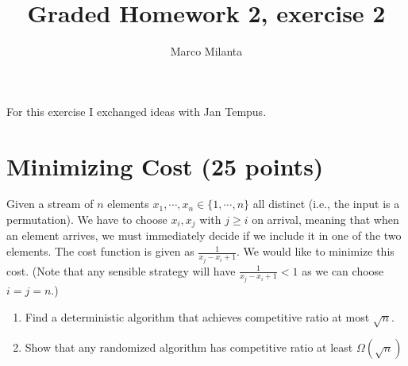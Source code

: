 \documentclass[11pt]{article}
\begin{document}
\author{Marco Milanta}
\title{Graded Homework 2, exercise 2}
\maketitle


For this exercise I exchanged ideas with Jan Tempus.
\section*{Minimizing Cost (25 points)}
Given a stream of $n$ elements $x_1, \cdots, x_n \in \{1,\cdots,n\}$ all distinct (i.e., the input is a permutation). We have to choose $x_i, x_j$ with $j\geq i$ on arrival, meaning that when an element arrives, we must immediately decide if we include it in one of the two elements. The cost function is given as $\frac{1}{x_j-x_i+1}$. We would like to minimize this cost. (Note that any sensible strategy will have $\frac{1}{x_j-x_i+1} < 1$ as we can choose $i=j=n$.)
\begin{enumerate}
    \item Find a deterministic algorithm that achieves competitive ratio at most $\sqrt{n}$.
    \item Show that any randomized algorithm has competitive ratio at least $\Omega(\sqrt{n})$
\end{enumerate}
\end{document}

